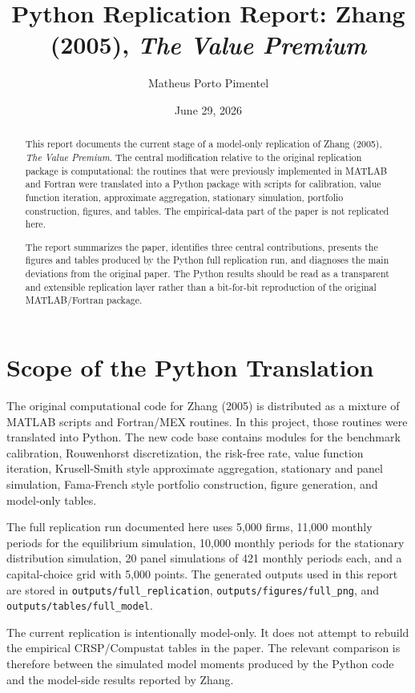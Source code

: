 \documentclass[11pt]{article}
\title{Python Replication Report: Zhang (2005), \textit{The Value Premium}}
\author{Matheus Porto Pimentel}
\date{June 29, 2026}
\begin{document}
\maketitle

\begin{abstract}
This report documents the current stage of a model-only replication of Zhang (2005), \textit{The Value Premium}. The central modification relative to the original replication package is computational: the routines that were previously implemented in MATLAB and Fortran were translated into a Python package with scripts for calibration, value function iteration, approximate aggregation, stationary simulation, portfolio construction, figures, and tables. The empirical-data part of the paper is not replicated here.

The report summarizes the paper, identifies three central contributions, presents the figures and tables produced by the Python full replication run, and diagnoses the main deviations from the original paper. The Python results should be read as a transparent and extensible replication layer rather than a bit-for-bit reproduction of the original MATLAB/Fortran package.
\end{abstract}

\section{Scope of the Python Translation}

The original computational code for Zhang (2005) is distributed as a mixture of MATLAB scripts and Fortran/MEX routines. In this project, those routines were translated into Python. The new code base contains modules for the benchmark calibration, Rouwenhorst discretization, the risk-free rate, value function iteration, Krusell-Smith style approximate aggregation, stationary and panel simulation, Fama-French style portfolio construction, figure generation, and model-only tables.

The full replication run documented here uses 5,000 firms, 11,000 monthly periods for the equilibrium simulation, 10,000 monthly periods for the stationary distribution simulation, 20 panel simulations of 421 monthly periods each, and a capital-choice grid with 5,000 points. The generated outputs used in this report are stored in \texttt{outputs/full\_replication}, \texttt{outputs/figures/full\_png}, and \texttt{outputs/tables/full\_model}.

The current replication is intentionally model-only. It does not attempt to rebuild the empirical CRSP/Compustat tables in the paper. The relevant comparison is therefore between the simulated model moments produced by the Python code and the model-side results reported by Zhang.
\end{document}
